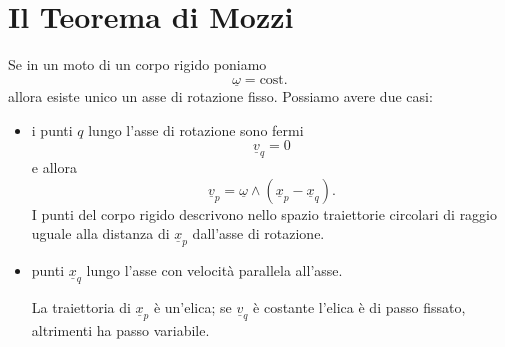 \chapter{Il Teorema di Mozzi}
Se in un moto di un corpo rigido poniamo
\[
\underline{\omega}=\text{cost.}
\]
allora esiste unico un asse di rotazione fisso. Possiamo avere due casi:

\begin{itemize}
    \item[(i)] i punti $q$ lungo l'asse di rotazione sono fermi
    \[
    \underline{v}_q=0
    \]
    e allora
    \[
    \underline{v}_p=\underline{\omega}\wedge(\underline{x}_p-\underline{x}_q).
    \]
    I punti del corpo rigido descrivono nello spazio traiettorie circolari di raggio uguale alla distanza di $\underline{x}_p$ dall'asse di rotazione.

    \item[(ii)] punti $\underline{x}_q$ lungo l'asse con velocità parallela all'asse.

    La traiettoria di $\underline{x}_p$ è un'elica; se $\underline{v}_q$ è costante l'elica è di passo fissato, altrimenti ha passo variabile.
\end{itemize}

